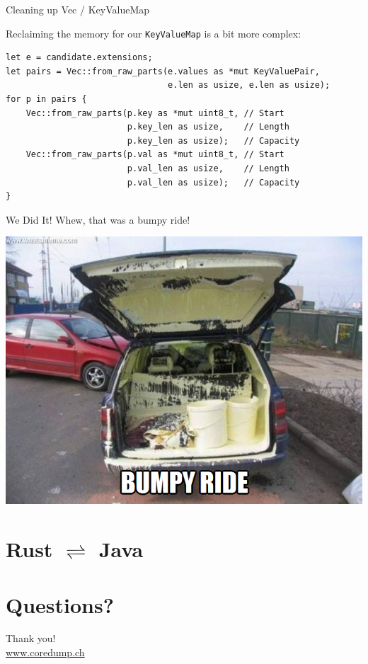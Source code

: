 \documentclass[aspectratio=1610,14pt,t]{beamer}
\begin{document}
\begin{frame}[c,fragile]{Cleaning up Vec / KeyValueMap}

  Reclaiming the memory for our \texttt{KeyValueMap} is a bit more complex:

  \begin{verbatim}
let e = candidate.extensions;
let pairs = Vec::from_raw_parts(e.values as *mut KeyValuePair,
                                e.len as usize, e.len as usize);
for p in pairs {
    Vec::from_raw_parts(p.key as *mut uint8_t, // Start
                        p.key_len as usize,    // Length
                        p.key_len as usize);   // Capacity
    Vec::from_raw_parts(p.val as *mut uint8_t, // Start
                        p.val_len as usize,    // Length
                        p.val_len as usize);   // Capacity
}
  \end{verbatim}
\end{frame}

\begin{frame}[c]{We Did It!}
  \centering
  Whew, that was a bumpy ride!

  \includegraphics[width=.6\textwidth]{img/bump.png}
\end{frame}


\section{Rust $\rightleftharpoons$ Java}


\section{Questions?}


{
\begin{frame}[standout]
	\begin{centering}
	{\Huge Thank you!}\\
	{\normalsize \url{www.coredump.ch}}\\
	\end{centering}
\end{frame}
}
\end{document}
